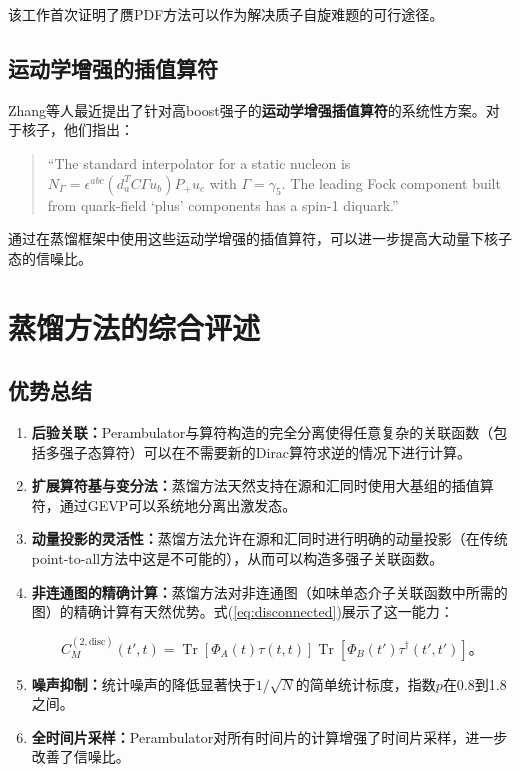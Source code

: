 \documentclass[12pt,a4paper]{ctexart}
\theoremstyle{definition}
\begin{document}
该工作首次证明了赝PDF方法可以作为解决质子自旋难题的可行途径\cite{Egerer2022}。

\subsection{运动学增强的插值算符}

Zhang等人\cite{Zhang2025kinematic}最近提出了针对高boost强子的\textbf{运动学增强插值算符}的系统性方案。对于核子，他们指出：

\begin{quote}
``The standard interpolator for a static nucleon is $N_\Gamma = \epsilon^{abc}(d^T_a C\Gamma u_b)P_+ u_c$ with $\Gamma = \gamma_5$. The leading Fock component built from quark-field `plus' components has a spin-1 diquark.''\cite{Zhang2025kinematic}
\end{quote}

通过在蒸馏框架中使用这些运动学增强的插值算符，可以进一步提高大动量下核子态的信噪比\cite{Zhang2025kinematic,Chen2025gluon}。

\section{蒸馏方法的综合评述}

\subsection{优势总结}

\begin{enumerate}
    \item \textbf{后验关联：}Perambulator与算符构造的完全分离使得任意复杂的关联函数（包括多强子态算符）可以在不需要新的Dirac算符求逆的情况下进行计算\cite{Peardon2009}。

    \item \textbf{扩展算符基与变分法：}蒸馏方法天然支持在源和汇同时使用大基组的插值算符，通过GEVP可以系统地分离出激发态\cite{Peardon2009,Egerer2021a}。

    \item \textbf{动量投影的灵活性：}蒸馏方法允许在源和汇同时进行明确的动量投影（在传统point-to-all方法中这是不可能的），从而可以构造多强子关联函数\cite{Peardon2009}。

    \item \textbf{非连通图的精确计算：}蒸馏方法对非连通图（如味单态介子关联函数中所需的图）的精确计算有天然优势。式(\ref{eq:disconnected})展示了这一能力\cite{Peardon2009}：

    \begin{equation}
    C^{(2,\text{disc})}_M(t', t) = \operatorname{Tr}\left[ \Phi_A(t)\tau(t,t) \right] \operatorname{Tr}\left[ \Phi_B(t')\tau^\dagger(t',t') \right]。
    \label{eq:disconnected}
    \end{equation}

    \item \textbf{噪声抑制：}统计噪声的降低显著快于$1/\sqrt{N}$的简单统计标度，指数$p$在0.8到1.8之间\cite{Peardon2009}。

    \item \textbf{全时间片采样：}Perambulator对所有时间片的计算增强了时间片采样，进一步改善了信噪比\cite{Egerer2021a}。
\end{enumerate}
\end{document}
